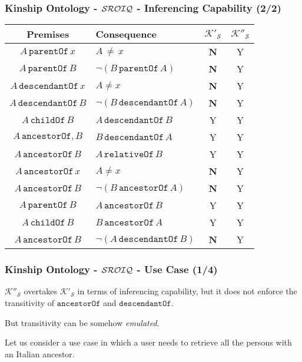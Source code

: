 \documentclass[8pt]{beamer}
\newcommand{\relative}{\mathtt{relativeOf}}
\newcommand{\child}{\mathtt{childOf}}
\newcommand{\parent}{\mathtt{parentOf}}
\newcommand{\ancestor}{\mathtt{ancestorOf}}
\newcommand{\descendant}{\mathtt{descendantOf}}
\newcommand{\Alice}{A}
\newcommand{\Bob}{B}
\newcommand{\KBtra}{\mathcal{K}'_{\mathcal{S}}}
\newcommand{\KBirr}{\mathcal{K}''_{\mathcal{S}}}
\newcommand{\testpassed}{\textsf{Y}}
\newcommand{\testfailed}{\bf{\textsf{N}}}
\begin{document}
\begin{frame}
\frametitle{Kinship Ontology - $\mathcal{SROIQ}$ - Inferencing Capability (2/2) }
\begin{center}
\begin{small}
\begin{tabular}{|c|l|c|c|}
\hline
\bf{Premises} & \bf{Consequence} & $\KBtra$ & $\KBirr$\\
\hline
$\Alice\,\parent\,x$ & $\Alice\,\neq\,x$ & \testfailed & \testpassed\\
\hline
$\Alice\,\parent\,\Bob$ & $\neg( \Bob\,\parent\,\Alice )$ & \testfailed & \testpassed\\
\hline
$\Alice\,\descendant\,x$ & $\Alice \neq x$ & \testfailed & \testpassed\\
\hline
$\Alice\,\descendant\,\Bob$ & $\neg( \Bob\,\descendant\,\Alice )$ & \testfailed & \testpassed\\
\hline
$\Alice\,\child\,\Bob$ & $\Alice\,\descendant\,\Bob$ & \testpassed & \testpassed\\
\hline
$\Alice\,\ancestor,\Bob$ & $\Bob\,\descendant\,\Alice$ & \testpassed & \testpassed\\
\hline
$\Alice\,\ancestor\,\Bob$ & $\Alice\,\relative\,\Bob$ & \testpassed & \testpassed\\
\hline
$\Alice\,\ancestor\,x$ & $\Alice \neq x$& \testfailed & \testpassed\\
\hline
$\Alice\,\ancestor\,\Bob$ & $\neg( \Bob\,\ancestor\,\Alice )$& \testfailed & \testpassed\\
\hline
$\Alice\,\parent\,\Bob$ & $\Alice\,\ancestor\,\Bob$& \testpassed & \testpassed\\
\hline
$\Alice\,\child\,\Bob$ & $\Bob\,\ancestor\,\Alice$ & \testpassed & \testpassed\\
\hline
$\Alice\,\ancestor\,\Bob$ & $\neg( \Alice\,\descendant\,\Bob )$ & \testfailed & \testpassed\\
\hline
\end{tabular}
\end{small}
\end{center}
\end{frame}

\begin{frame}
\frametitle{Kinship Ontology - $\mathcal{SROIQ}$ - Use Case (1/4)}

$\KBirr$ overtakes $\KBtra$ in terms of inferencing capability, but
it does not enforce the transitivity of $\ancestor$ and $\descendant$.
\vspace{\baselineskip}

But transitivity can be somehow \emph{emulated}.
\vspace{\baselineskip}

Let us consider a use case in which a user needs to retrieve all 
the persons with an Italian ancestor.
\end{frame}
\end{document}
